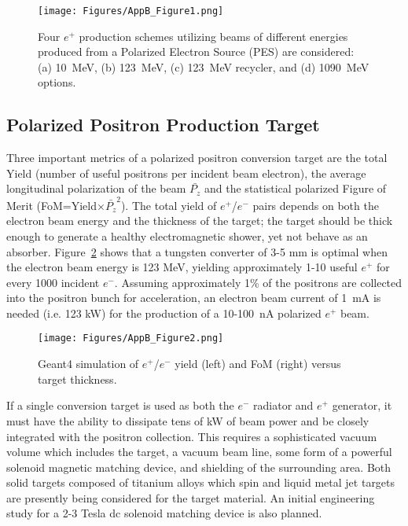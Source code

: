 %
\begin{figure}[tbh]
 \centering
 \texttt{[image: Figures/AppB\_Figure1.png]}
 \caption{Four $e^+$ production schemes utilizing beams of different energies produced from a Polarized Electron Source (PES) are considered: (a) 10~MeV, (b) 123~MeV, (c) 123~MeV recycler, and (d) 1090~MeV options.}
 \label{AppB_Figure1}
\end{figure}
%

\subsection{Polarized Positron Production Target}

Three important metrics of a polarized positron conversion target are the total Yield (number of useful positrons per incident beam electron), the average longitudinal polarization of the beam $\bar{P_{z}}$ and the statistical polarized Figure of Merit (FoM=Yield$\times \bar{P_{z}}^{2}$). The total yield of $e^+$/$e^-$ pairs depends on both the electron beam energy and the thickness of the target; the target should be thick enough to generate a healthy electromagnetic shower, yet not behave as an absorber.  Figure~\ref{AppB_Figure2} shows that a tungsten converter of 3-5 mm is optimal when the electron beam energy is 123 MeV, yielding approximately 1-10 useful $e^+$ for every 1000 incident $e^-$. Assuming approximately 1\% of the positrons are collected into the positron bunch for acceleration, an electron beam current of 1~mA is needed (i.e. 123 kW) for the production of a 10-100~nA polarized $e^+$ beam.

%
\begin{figure}[tbh]
 \centering
 \texttt{[image: Figures/AppB\_Figure2.png]}
 \caption{Geant4 simulation of $e^+$/$e^-$ yield (left) and FoM (right) versus target thickness.}
 \label{AppB_Figure2}
\end{figure}
%

If a single conversion target is used as both the $e^-$ radiator and $e^+$ generator, it must have the ability to dissipate tens of kW of beam power and be closely integrated with the positron collection. This requires a sophisticated vacuum volume which includes the target, a vacuum beam line,  some form of a powerful solenoid magnetic matching device, and shielding of the surrounding area.  Both solid targets composed of titanium alloys which spin and liquid metal jet targets are presently being considered for the target material.  An initial engineering study for a 2-3 Tesla dc solenoid matching device is also planned.

